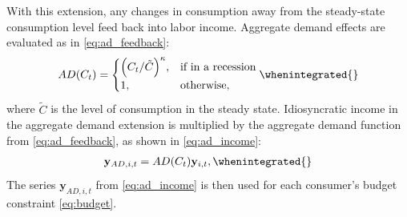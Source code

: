 \documentclass[\latexroot/\projectname]{subfiles}
\begin{document}
With this extension, any changes in consumption away from the steady-state consumption level feed back into labor income.
Aggregate demand effects are evaluated as in \eqref{eq:ad_feedback}:
\begin{equation}
  \begin{gathered}
    \begin{aligned}
      AD(C_t) =   \begin{cases}{\Big(C_t/\tilde{C}\Big)}^\kappa, & \text{if in a recession} \\
             1,                                & \text{otherwise} ,
                  \end{cases}
      \whenintegrated{\label{eq:ad_feedback}} %
    \end{aligned}
  \end{gathered}
\end{equation}
where $\tilde{C}$ is the level of consumption in the steady state.
Idiosyncratic income in the aggregate demand extension is multiplied by the aggregate demand function from \eqref{eq:ad_feedback}, as shown in \eqref{eq:ad_income}:
\begin{equation}
  \begin{gathered}
    \begin{aligned}
      \mathbf{y}_{AD,i,t} = AD(C_t)\mathbf{y}_{i,t},
      \whenintegrated{\label{eq:ad_income}} %
    \end{aligned}
  \end{gathered}
\end{equation}
The series $\mathbf{y}_{AD,i,t}$ from \eqref{eq:ad_income} is then used for each consumer's budget constraint \eqref{eq:budget}.

\smartbib

\pdfonly{
  \captionsetup[figure]{list=no}
  \captionsetup[table]{list=no}
}
\end{document}
